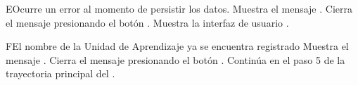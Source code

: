     \begin{UCtrayectoriaA}{E}{Ocurre un error al momento de persistir los datos.}
    	\UCpaso Muestra el mensaje .
    	\UCpaso[\UCactor] Cierra el mensaje presionando el botón .
    	\UCpaso Muestra la interfaz de usuario .
    \end{UCtrayectoriaA}


    \begin{UCtrayectoriaA}{F}{El nombre de la Unidad de Aprendizaje ya se encuentra registrado}
    	\UCpaso Muestra el mensaje .
    	\UCpaso[\UCactor] Cierra el mensaje presionando el botón .
    	\UCpaso Continúa en el paso 5 de la trayectoria principal del .
    \end{UCtrayectoriaA}